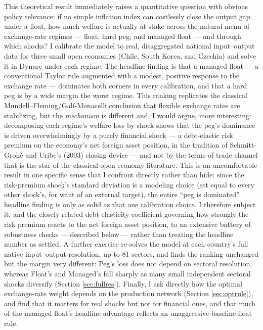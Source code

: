 \documentclass[12pt]{article}
\begin{document}
This theoretical result immediately raises a quantitative question with obvious policy relevance:
if no simple inflation index can costlessly close the output gap under a float, how much welfare is
actually at stake across the natural menu of exchange-rate regimes --- float, hard peg, and managed
float --- and through which shocks? I calibrate the model to real, disaggregated national
input--output data for three small open economies (Chile, South Korea, and Czechia) and solve it in
Dynare under each regime. The headline finding is that a managed float --- a conventional Taylor rule
augmented with a modest, positive response to the exchange rate --- dominates both corners in every
calibration, and that a hard peg is by a wide margin the worst regime. This ranking replicates the
classical Mundell--Fleming/Gal\'i-Monacelli conclusion that flexible exchange rates are stabilizing,
but the \emph{mechanism} is different and, I would argue, more interesting: decomposing each regime's
welfare loss by shock shows that the peg's dominance is driven overwhelmingly by a purely financial
shock --- a debt-elastic risk premium on the economy's net foreign asset position, in the tradition
of Schmitt-Grohé and Uribe's (2003) closing device --- and not by the terms-of-trade channel that is
the star of the classical open-economy literature. This is an uncomfortable result in one specific
sense that I confront directly rather than hide: since the risk-premium shock's standard deviation is
a modeling choice (set equal to every other shock's, for want of an external target), the entire
``peg is dominated'' headline finding is only as solid as that one calibration choice. I therefore
subject it, and the closely related debt-elasticity coefficient governing how strongly the risk
premium reacts to the net foreign asset position, to an extensive battery of robustness checks ---
described below --- rather than treating the headline number as settled. A further exercise re-solves the model at each
country's full native input--output resolution, up to 81 sectors, and finds the ranking unchanged but
the margin very different: Peg's loss does not depend on sectoral resolution, whereas Float's and
Managed's fall sharply as many small independent sectoral shocks diversify (Section
\ref{sec:fullres}). Finally, I ask directly how the optimal exchange-rate weight depends on the production network
(Section \ref{sec:optrule}), and find that it matters for real shocks but not for financial ones, and that much of the managed
float's headline advantage reflects an unaggressive baseline float rule.
\end{document}
